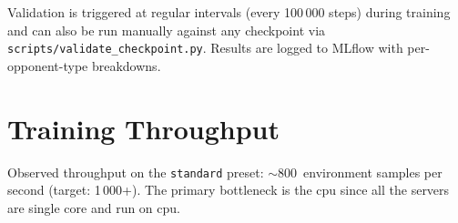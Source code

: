 Validation is triggered at regular intervals (every 100\,000 steps) during
training and can also be run manually against any checkpoint via
\texttt{scripts/validate\_checkpoint.py}.  Results are logged to MLflow with
per-opponent-type breakdowns.

\section{Training Throughput}

Observed throughput on the \texttt{standard} preset:
$\sim$800~environment samples per second (target: 1\,000+).  The primary
bottleneck is the cpu since all the servers are single core and run on cpu.
